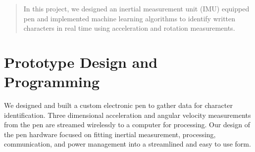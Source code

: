 \documentclass{article}
\begin{document}
 


\begin{abstract} 
In this project, we designed an inertial measurement unit (IMU) equipped pen and implemented machine learning algorithms to identify written characters in real time using acceleration and rotation measurements.
\end{abstract} 



\section{Prototype Design and Programming}
We designed and built a custom electronic pen to gather data for character identification. Three dimensional acceleration and angular velocity measurements from the pen are streamed wirelessly to a computer for processing.  Our design of the pen hardware focused on fitting inertial measurement, processing, communication, and power management into a streamlined and easy to use form.
\end{document}
